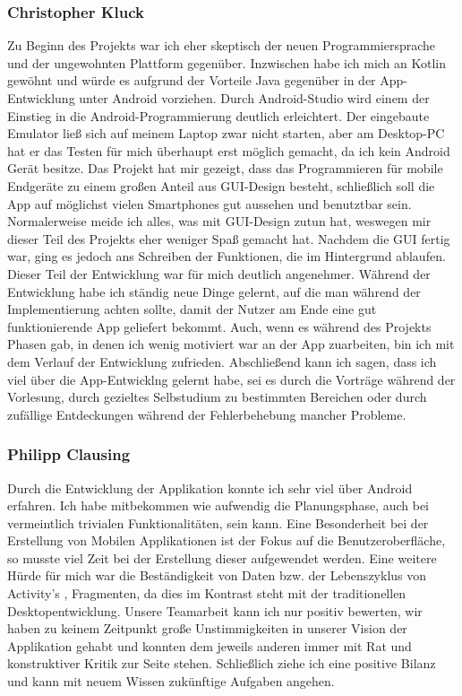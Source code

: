 \subsubsection{Christopher Kluck}
Zu Beginn des Projekts war ich eher skeptisch der neuen Programmiersprache und der ungewohnten Plattform gegenüber. Inzwischen habe ich mich an Kotlin gewöhnt und würde es aufgrund der Vorteile Java gegenüber in der App-Entwicklung unter Android vorziehen. Durch Android-Studio wird einem der Einstieg in die Android-Programmierung deutlich erleichtert. Der eingebaute Emulator ließ sich auf meinem Laptop zwar nicht starten, aber am Desktop-PC hat er das Testen für mich überhaupt erst möglich gemacht, da ich kein Android Gerät besitze. Das Projekt hat mir gezeigt, dass das Programmieren für mobile Endgeräte zu einem großen Anteil aus GUI-Design besteht, schließlich soll die App auf möglichst vielen Smartphones gut aussehen und benutztbar sein. Normalerweise meide ich alles, was mit GUI-Design zutun hat, weswegen mir dieser Teil des Projekts eher weniger Spaß gemacht hat. Nachdem die GUI fertig war, ging es jedoch ans Schreiben der Funktionen, die im Hintergrund ablaufen. Dieser Teil der Entwicklung war für mich deutlich angenehmer. Während der Entwicklung habe ich ständig neue Dinge gelernt, auf die man während der Implementierung achten sollte, damit der Nutzer am Ende eine gut funktionierende App geliefert bekommt. Auch, wenn es während des Projekts Phasen gab, in denen ich wenig motiviert war an der App zuarbeiten, bin ich mit dem Verlauf der Entwicklung zufrieden. Abschließend kann ich sagen, dass ich viel über die App-Entwicklng gelernt habe, sei es durch die Vorträge während der Vorlesung, durch gezieltes Selbstudium zu bestimmten Bereichen oder durch zufällige Entdeckungen während der Fehlerbehebung mancher Probleme.

\subsubsection{Philipp Clausing}
Durch die Entwicklung der Applikation konnte ich sehr viel über Android erfahren. Ich habe mitbekommen wie aufwendig die Planungsphase, auch bei vermeintlich trivialen Funktionalitäten, sein kann. Eine Besonderheit bei der Erstellung von Mobilen Applikationen ist der Fokus auf die Benutzeroberfläche, so musste viel Zeit bei der Erstellung dieser aufgewendet werden. Eine weitere Hürde für mich war die \grqq Beständigkeit\grqq{} von Daten bzw. der Lebenszyklus von Activity's , Fragmenten, da dies im Kontrast steht mit der traditionellen Desktopentwicklung. Unsere Teamarbeit kann ich nur positiv bewerten, wir haben zu keinem Zeitpunkt große Unstimmigkeiten in unserer Vision der Applikation gehabt und konnten dem jeweils anderen immer mit Rat und konstruktiver Kritik zur Seite stehen. Schließlich ziehe ich eine positive Bilanz und kann mit neuem Wissen zukünftige Aufgaben angehen.

